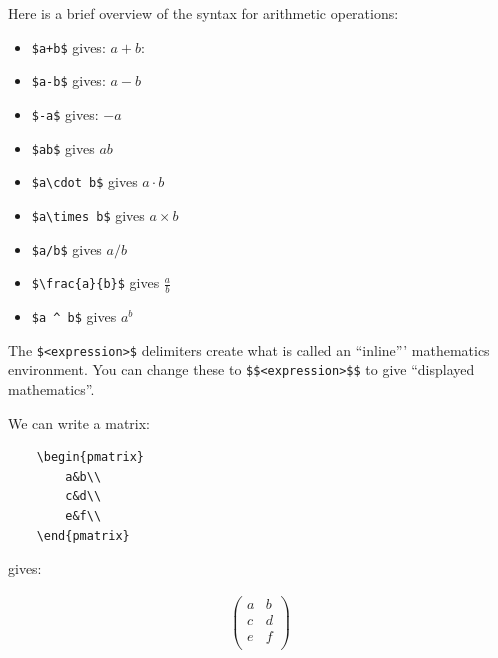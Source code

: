 Here is a brief overview of the syntax for arithmetic operations:
\begin{itemize}
\item 

\texttt{\$a+b\$} gives: \(a + b\):

\item 

\texttt{\$a-b\$} gives: \(a-b\)

\item 

\texttt{\$-a\$} gives: \(-a\)

\item 

\texttt{\$ab\$} gives \(ab\)

\item 

\texttt{\$a\textbackslash{}cdot b\$} gives \(a\cdot b\)

\item 

\texttt{\$a\textbackslash{}times b\$} gives \(a\times b\)

\item 

\texttt{\$a/b\$} gives \(a/b\)

\item 

\texttt{\$\textbackslash{}frac\{a\}\{b\}\$} gives \(\frac{a}{b}\)

\item 

\texttt{\$a \textasciicircum{} b\$} gives \(a ^ b\)

\end{itemize}


The \texttt{\$<expression>\$} delimiters create what is called an ``inline'''
mathematics environment.
You can change these to \texttt{\$\$<expression>\$\$} to give ``displayed
mathematics''.


We can write a matrix:

\begin{verbatim}
    \begin{pmatrix}
        a&b\\
        c&d\\
        e&f\\
    \end{pmatrix}
\end{verbatim}


gives:

\begin{equation*}
\begin{split}
    \begin{pmatrix}
        a&b\\
        c&d\\
        e&f\\
    \end{pmatrix}
\end{split}
\end{equation*}

